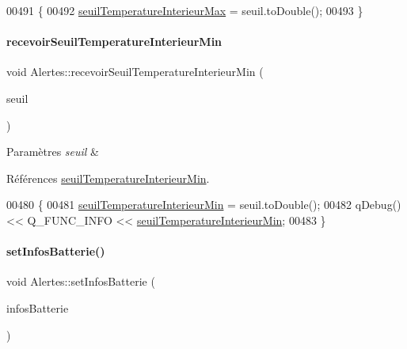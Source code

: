 \begin{DoxyCode}
00491 \{
00492     \hyperlink{class_alertes_abeda87298576a3b3eefcca9a96b8a0a9}{seuilTemperatureInterieurMax} = seuil.toDouble();
00493 \}
\end{DoxyCode}
\mbox{\label{class_alertes_a0e5e5177eed435d74bcbdc2a36911e52}} 
\paragraph{\texorpdfstring{recevoir\+Seuil\+Temperature\+Interieur\+Min}{recevoirSeuilTemperatureInterieurMin}}
{\footnotesize\ttfamily void Alertes\+::recevoir\+Seuil\+Temperature\+Interieur\+Min (\begin{DoxyParamCaption}\item[{Q\+String}]{seuil }\end{DoxyParamCaption})\hspace{0.3cm}{\ttfamily [slot]}}


\begin{DoxyParams}{Paramètres}
{\em seuil} & \\
\hline
\end{DoxyParams}


Références \hyperlink{class_alertes_a1c970252300a177bef641ca5399d3783}{seuil\+Temperature\+Interieur\+Min}.


\begin{DoxyCode}
00480 \{
00481     \hyperlink{class_alertes_a1c970252300a177bef641ca5399d3783}{seuilTemperatureInterieurMin} = seuil.toDouble();
00482     qDebug() << Q\_FUNC\_INFO << \hyperlink{class_alertes_a1c970252300a177bef641ca5399d3783}{seuilTemperatureInterieurMin};
00483 \}
\end{DoxyCode}
\mbox{\label{class_alertes_a8bbe30ddc4893f943781749917b23463}} 
\paragraph{\texorpdfstring{set\+Infos\+Batterie()}{setInfosBatterie()}}
{\footnotesize\ttfamily void Alertes\+::set\+Infos\+Batterie (\begin{DoxyParamCaption}\item[{\hyperlink{class_infos_batterie}{Infos\+Batterie} $\ast$}]{infos\+Batterie }\end{DoxyParamCaption})}



